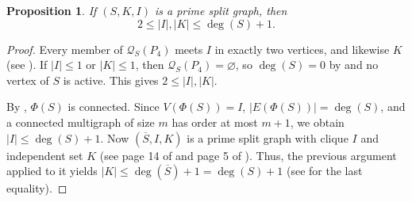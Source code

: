 \documentclass[11pt]{article}
\newtheorem{proposition}[proposition]{Proposition}
\begin{document}
\begin{proposition}
	\label{|I|_|K|<=2deg(S)}
	If $(S,K,I)$ is a prime split graph, then 
	\[2 \leq |I|, |K| \leq \deg(S)+1.\]
%		
\end{proposition}

\begin{proof}
	Every member of $\mathcal{Q}_S(P_4)$ meets $I$ in exactly two vertices, and likewise $K$ (see \cite{pastine2025simple}). If $|I| \leq 1$ or $|K| \leq 1$, then $\mathcal{Q}_S(P_4) = \varnothing$, so $\deg(S)=0$ by  and no vertex of $S$ is active. This gives $2 \leq |I|,|K|$.
		
		By , $\Phi(S)$ is connected. Since $V(\Phi(S))=I$, $|E(\Phi(S))|=\deg(S)$, and a connected multigraph of size $m$ has order at most $m+1$, we obtain $|I| \leq \deg(S)+1$. Now $(\overline{S},I,K)$ is a prime split graph with clique $I$ and independent set $K$ (see page 14 of \cite{tyshkevich2000decomposition} and page 5 of \cite{pastine20252}). Thus, the previous argument applied to it yields $|K| \leq \deg(\overline{S})+1 = \deg(S)+1$ (see \cite{pastine20252} for the last equality). 
\end{proof}
\end{document}
